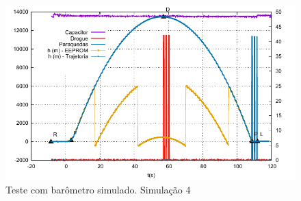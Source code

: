 \documentclass[12pt,a4paper]{article}
\begin{document}
\begin{figure}[!ht]
	\centering
	\includegraphics[width=\textwidth]{./data/simulations-v1.5.5/sim04/fig}
	\caption{Teste com barômetro simulado.  Simulação 4}
	\label{fig:sim04}
\end{figure}
	
\end{document}
